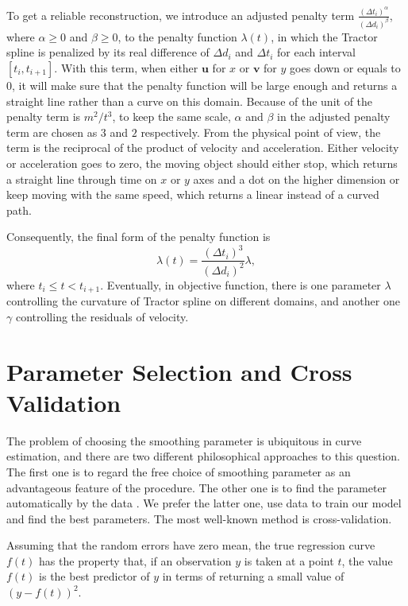 To get a reliable reconstruction, we introduce an adjusted penalty term $\frac{(\Delta t_i)^\alpha}{(\Delta d_i)^\beta}$, where $\alpha \ge 0$ and $\beta \ge 0$, to the penalty function $\lambda(t)$, in which the Tractor spline is penalized by its real difference of $\Delta d_i$ and $\Delta t_i$ for each interval $[t_i, t_{i+1}]$. With this term, when either $\mathbf{u}$ for $x$ or $\mathbf{v}$ for $y$ goes down or equals to 0, it will make sure that the penalty function will be large enough and returns a straight line rather than a curve on this domain. Because of the unit of the penalty term is $m^2/t^3$, to keep the same scale, $\alpha$ and $\beta$ in the adjusted penalty term are chosen as $3$ and $2$ respectively. From the physical point of view, the term is the reciprocal of the product of velocity and acceleration. Either velocity or acceleration goes to zero, the moving object should either stop, which returns a straight line through time on $x$ or $y$ axes and a dot on the higher dimension or keep moving with the same speed, which returns a linear instead of a curved path. 

Consequently, the final form of the penalty function is 
\begin{equation}\label{adjustedpenalty}
\lambda(t)=\frac{(\Delta t_i)^3}{(\Delta d_i)^2}\lambda,
\end{equation}
where  $t_i\leq t < t_{i+1}$. Eventually, in objective function, there is one parameter $\lambda$ controlling the curvature of Tractor spline on different domains, and another one $\gamma$ controlling the residuals of velocity. 




\section{Parameter Selection and Cross Validation}

The problem of choosing the smoothing parameter is ubiquitous in curve estimation, and there are two different philosophical approaches to this question. The first one is to regard the free choice of smoothing parameter as an advantageous feature of the procedure. The other one is to find the parameter automatically by the data \cite{green1993nonparametric}. We prefer the latter one, use data to train our model and find the best parameters. The most well-known method is cross-validation.


Assuming that the random errors have zero mean, the true regression curve $f(t)$ has the property that, if an observation $y$ is taken at a point $t$, the value $f(t)$ is the best predictor of $y$ in terms of returning a small value of $(y-f(t))^2$. 

